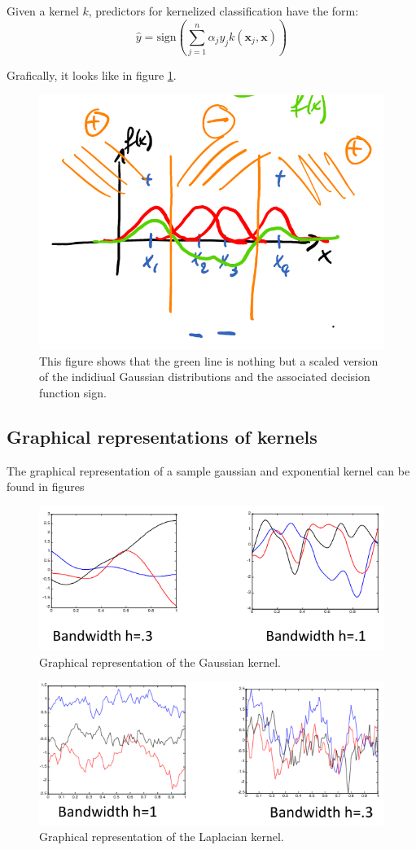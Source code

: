 \documentclass[a4paper,10pt,twoside]{article}
\begin{document}
Given a kernel $k$, predictors for kernelized classification have the form:
\begin{equation*}
    \hat{y} = \text{sign}(\sum_{j=1}^{n}\alpha_jy_jk(\mathbf{x}_j,\mathbf{x}))
\end{equation*}

Grafically, it looks like in figure \ref{decision_function_kernelized}.

\begin{figure}[htbp]
    \centering
    \includegraphics[width=.5\textwidth]{figures/decision_function_kernelized.png}
    \caption{This figure shows that the green line is nothing but a scaled version of the indidiual Gaussian distributions and the associated decision function sign.}
    \label{decision_function_kernelized}
\end{figure}

\subsection{Graphical representations of kernels}

The graphical representation of a sample gaussian and exponential kernel can be found in figures

\begin{figure}[htbp]
    \centering
    \includegraphics[width=.5\textwidth]{figures/gaussian_kernel.png}
    \caption{Graphical representation of the Gaussian kernel.}
    \label{gaussian_kernel}
\end{figure}

\begin{figure}[htbp]
    \centering
    \includegraphics[width=.5\textwidth]{figures/laplacian_kernel.png}
    \caption{Graphical representation of the Laplacian kernel.}
    \label{laplacian_kernel}
\end{figure}
\end{document}
